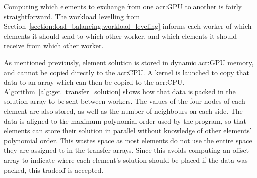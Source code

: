 Computing which elements to exchange from one \acrshort{acr:GPU} to another is fairly
straightforward. The workload levelling from Section~\ref{section:load_balancing:workload_leveling}
informs each worker of which elements it should send to which other worker, and which elements it
should receive from which other worker. 

As mentioned previously, element solution is stored in dynamic \acrshort{acr:GPU} memory, and cannot
be copied directly to the \acrshort{acr:CPU}. A kernel is launched to copy that data to an array
which can then be copied to the \acrshort{acr:CPU}. Algorithm~\ref{alg:get_transfer_solution} shows
how that data is packed in the solution array to be sent between workers. The values of the four
nodes of each element are also stored, as well as the number of neighbours on each side. The data is
aligned to the maximum polynomial order used by the program, so that elements can store their
solution in parallel without knowledge of other elements' polynomial order. This wastes space as
most elements do not use the entire space they are assigned to in the transfer arrays. Since this
avoids computing an offset array to indicate where each element's solution should be placed if the
data was packed, this tradeoff is accepted.

